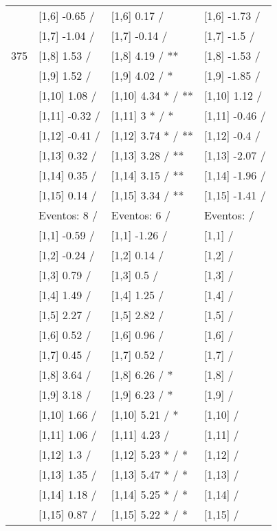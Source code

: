 \begin{table}
\begin{tabular}[t]{llll}
 & {}[1,6] -0.65  / & {}[1,6] 0.17  / & {}[1,6] -1.73  /\\
 & {}[1,7] -1.04  / & {}[1,7] -0.14  / & {}[1,7] -1.5  /\\
375 & {}[1,8] 1.53  / & {}[1,8] 4.19  / ** & {}[1,8] -1.53  /\\
\addlinespace
 & {}[1,9] 1.52  / & {}[1,9] 4.02  / * & {}[1,9] -1.85  /\\
 & {}[1,10] 1.08  / & {}[1,10] 4.34 * / ** & {}[1,10] 1.12  /\\
 & {}[1,11] -0.32  / & {}[1,11] 3 * / * & {}[1,11] -0.46  /\\
 & {}[1,12] -0.41  / & {}[1,12] 3.74 * / ** & {}[1,12] -0.4  /\\
 & {}[1,13] 0.32  / & {}[1,13] 3.28  / ** & {}[1,13] -2.07  /\\
\addlinespace
 & {}[1,14] 0.35  / & {}[1,14] 3.15  / ** & {}[1,14] -1.96  /\\
 & {}[1,15] 0.14  / & {}[1,15] 3.34  / ** & {}[1,15] -1.41  /\\
 & Eventos:  8 / & Eventos:  6 / & Eventos:   /\\
 & {}[1,1] -0.59  / & {}[1,1] -1.26  / & {}[1,1]  /\\
 & {}[1,2] -0.24  / & {}[1,2] 0.14  / & {}[1,2]  /\\
\addlinespace
 & {}[1,3] 0.79  / & {}[1,3] 0.5  / & {}[1,3]  /\\
 & {}[1,4] 1.49  / & {}[1,4] 1.25  / & {}[1,4]  /\\
 & {}[1,5] 2.27  / & {}[1,5] 2.82  / & {}[1,5]  /\\
 & {}[1,6] 0.52  / & {}[1,6] 0.96  / & {}[1,6]  /\\
 & {}[1,7] 0.45  / & {}[1,7] 0.52  / & {}[1,7]  /\\
\addlinespace
500 & {}[1,8] 3.64  / & {}[1,8] 6.26  / * & {}[1,8]  /\\
 & {}[1,9] 3.18  / & {}[1,9] 6.23  / * & {}[1,9]  /\\
 & {}[1,10] 1.66  / & {}[1,10] 5.21  / * & {}[1,10]  /\\
 & {}[1,11] 1.06  / & {}[1,11] 4.23  / & {}[1,11]  /\\
 & {}[1,12] 1.3  / & {}[1,12] 5.23 * / * & {}[1,12]  /\\
\addlinespace
 & {}[1,13] 1.35  / & {}[1,13] 5.47 * / * & {}[1,13]  /\\
 & {}[1,14] 1.18  / & {}[1,14] 5.25 * / * & {}[1,14]  /\\
 & {}[1,15] 0.87  / & {}[1,15] 5.22 * / * & {}[1,15]  /\\
\bottomrule
\end{tabular}
\end{table}
